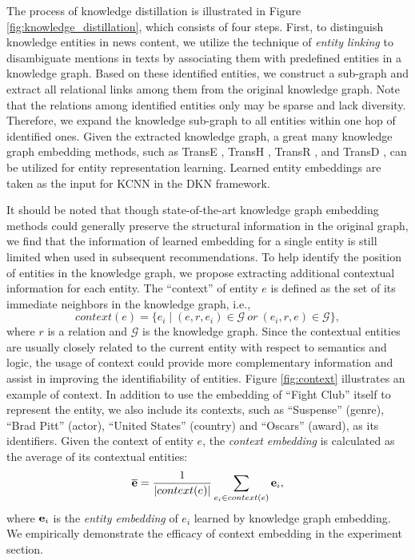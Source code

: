 \documentclass[sigconf]{acmart}
\begin{document}
		The process of knowledge distillation is illustrated in Figure \ref{fig:knowledge_distillation}, which consists of four steps.
		First, to distinguish knowledge entities in news content, we utilize the technique of \textit{entity linking} \cite{milne2008learning, sil2013re} to disambiguate mentions in texts by associating them with predefined entities in a knowledge graph.
		Based on these identified entities, we construct a sub-graph and extract all relational links among them from the original knowledge graph.
		Note that the relations among identified entities only may be sparse and lack diversity.
		Therefore, we expand the knowledge sub-graph to all entities within one hop of identified ones.
		Given the extracted knowledge graph, a great many knowledge graph embedding methods, such as TransE \cite{bordes2013translating}, TransH \cite{wang2014knowledge}, TransR \cite{lin2015learning}, and TransD \cite{ji2015knowledge}, can be utilized for entity representation learning.
		Learned entity embeddings are taken as the input for KCNN in the DKN framework.
		
		It should be noted that though state-of-the-art knowledge graph embedding methods could generally preserve the structural information in the original graph, we find that the information of learned embedding for a single entity is still limited when used in subsequent recommendations.
		To help identify the position of entities in the knowledge graph, we propose extracting additional contextual information for each entity.
		The ``context'' of entity $e$ is defined as the set of its immediate neighbors in the knowledge graph, i.e.,
		\begin{equation}
			context(e) = \{ e_i \mid (e, r, e_i) \in \mathcal G \ or \ (e_i, r, e) \in \mathcal G \},
		\end{equation}
		where $r$ is a relation and $\mathcal G$ is the knowledge graph.
		Since the contextual entities are usually closely related to the current entity with respect to semantics and logic, the usage of context could provide more complementary information and assist in improving the identifiability of entities.
		Figure \ref{fig:context} illustrates an example of context.
		In addition to use the embedding of ``\textsf{Fight Club}'' itself to represent the entity, we also include its contexts, such as ``\textsf{Suspense}'' (genre), ``\textsf{Brad Pitt}'' (actor), ``\textsf{United States}'' (country) and ``\textsf{Oscars}'' (award), as its identifiers.
		Given the context of entity $e$, the \textit{context embedding} is calculated as the average of its contextual entities:
		\begin{equation}
			\overline {\bf e} = \frac{1}{|context(e)|} \sum_{e_i \in context(e)} {\bf e}_i,
		\end{equation}
		where ${\bf e}_i$ is the \textit{entity embedding} of $e_i$ learned by knowledge graph embedding.
		We empirically demonstrate the efficacy of context embedding in the experiment section.
		
\end{document}
